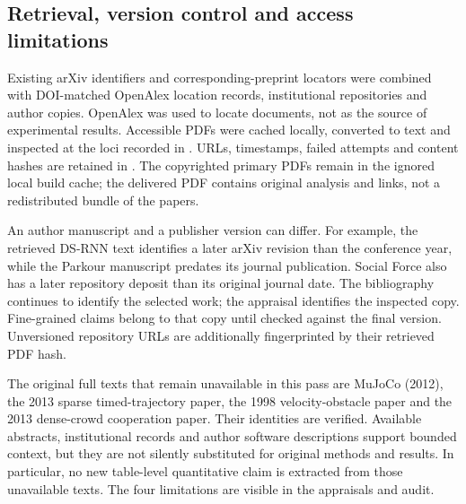 \subsection{Retrieval, version control and access limitations}
Existing arXiv identifiers and corresponding-preprint locators were combined with
DOI-matched OpenAlex location records, institutional repositories and author
copies. OpenAlex was used to locate documents, not as the source of experimental
results. Accessible PDFs were cached locally, converted to text and inspected
at the loci recorded in . URLs, timestamps, failed
attempts and content hashes are retained in .
The copyrighted primary PDFs remain in the ignored local build cache; the
delivered PDF contains original analysis and links, not a redistributed bundle
of the papers.

An author manuscript and a publisher version can differ. For example, the
retrieved DS-RNN text identifies a later arXiv revision than the conference year,
while the Parkour manuscript predates its journal publication. Social Force also
has a later repository deposit than its original journal date. The bibliography
continues to identify the selected work; the appraisal identifies the inspected
copy. Fine-grained claims belong to that copy until checked against the final
version. Unversioned repository URLs are additionally fingerprinted by their
retrieved PDF hash.

The original full texts that remain unavailable in this pass are MuJoCo (2012),
the 2013 sparse timed-trajectory paper, the 1998 velocity-obstacle paper and the
2013 dense-crowd cooperation paper. Their identities are verified. Available
abstracts, institutional records and author software descriptions support bounded
context, but they are not silently substituted for original methods and results.
In particular, no new table-level quantitative claim is extracted from those
unavailable texts. The four limitations are visible in the appraisals and audit.


